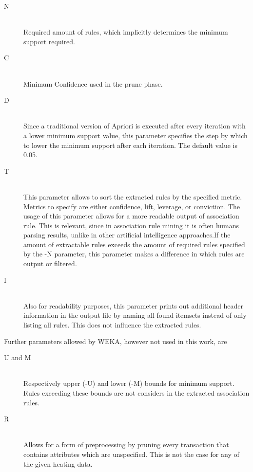 \documentclass[bachelor,english]{info1thesis}
\begin{document}
\begin{description}
	\item[N]\hfill \\
	Required amount of rules, which implicitly determines the minimum support required.
	\item[C]\hfill \\ 
	Minimum Confidence used in the prune phase.
	\item[D]\hfill \\ 
	Since a traditional version of Apriori is executed after every iteration with a lower minimum support value, this parameter specifies the step by which to lower the minimum support after each iteration. The default value is 0.05.
	\item[T]\hfill \\ 
	This parameter allows to sort the extracted rules by the specified metric. Metrics to specify are either confidence, lift, leverage, or conviction. The usage of this parameter allows for a more readable output of association rule. This is relevant, since in association rule mining it is often humans parsing results, unlike in other artificial intelligence approaches.\newline If the amount of extractable rules exceeds the amount of required rules specified by the -N parameter, this parameter makes a difference in which rules are output or filtered.
	
	\item[I]\hfill \\ 
	Also for readability purposes, this parameter prints out additional header information in the output file by naming all found itemsets instead of only listing all rules. This does not influence the extracted rules.
		
\end{description}

Further parameters allowed by WEKA, however not used in this work, are

\begin{description}
	\item[U and M]\hfill \\
	Respectively upper (-U) and lower (-M) bounds for minimum support. Rules exceeding these bounds are not considers in the extracted association rules.
	\item[R]\hfill \\ 
	Allows for a form of preprocessing by pruning every transaction that contains attributes which are unspecified. This is not the case for any of the given heating data.
	
\end{description}
\end{document}
